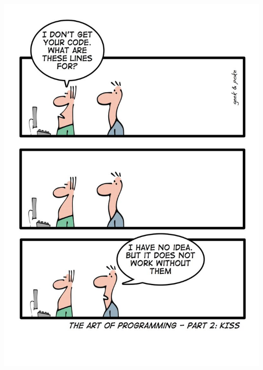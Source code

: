 \documentclass{efd-lecture}
\begin{document}
\begin{frame}
  \begin{center}
  \includegraphics[height=\textheight]{./img/cartoon-1.png}
  \end{center}
\end{frame}
\end{document}
